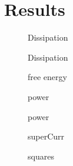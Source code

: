 \documentclass[a4paper]{article}
\begin{document}
\section{Results}
\begin{figure}
	\centering
	
	\caption{Dissipation}
\end{figure}

\begin{figure}
	\centering
	
	\caption{Dissipation}
\end{figure}

\begin{figure}
	\centering
	
	\caption{free energy}
\end{figure}

\begin{figure}
	\centering
	
	\caption{power}
\end{figure}

\begin{figure}
	\centering
	
	\caption{power}
\end{figure}

\begin{figure}
	\centering
	
	\caption{superCurr}
\end{figure}
\begin{figure}
	\centering
	
	\caption{squares}
\end{figure}




\end{document}
